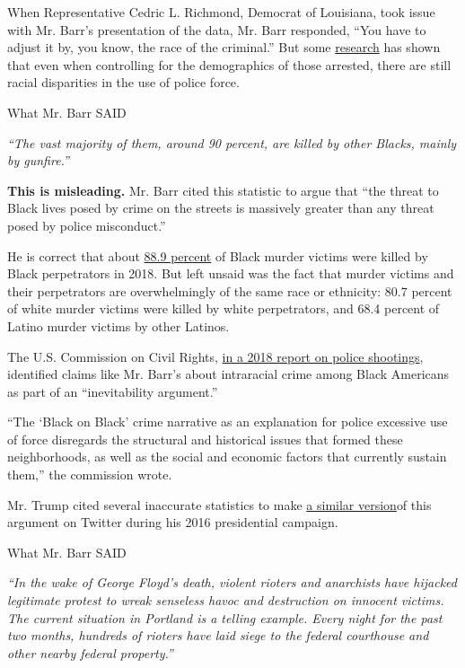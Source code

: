 When Representative Cedric L. Richmond, Democrat of Louisiana, took
issue with Mr. Barr's presentation of the data, Mr. Barr responded,
``You have to adjust it by, you know, the race of the criminal.'' But
some
\href{https://policingequity.org/images/pdfs-doc/CPE_SoJ_Race-Arrests-UoF_2016-07-08-1130.pdf}{research}
has shown that even when controlling for the demographics of those
arrested, there are still racial disparities in the use of police force.

What Mr. Barr SAID

\emph{``The vast majority of them, around 90 percent, are killed by
other Blacks, mainly by gunfire.''}

\textbf{This is misleading.} Mr. Barr cited this statistic to argue that
``the threat to Black lives posed by crime on the streets is massively
greater than any threat posed by police misconduct.''

He is correct that about
\href{https://ucr.fbi.gov/crime-in-the-u.s/2018/crime-in-the-u.s.-2018/tables/expanded-homicide-data-table-6.xls}{88.9
percent} of Black murder victims were killed by Black perpetrators in
2018. But left unsaid was the fact that murder victims and their
perpetrators are overwhelmingly of the same race or ethnicity: 80.7
percent of white murder victims were killed by white perpetrators, and
68.4 percent of Latino murder victims by other Latinos.

The U.S. Commission on Civil Rights,
\href{https://www.usccr.gov/pubs/2018/11-15-Police-Force.pdf}{in a 2018
report on police shootings}, identified claims like Mr. Barr's about
intraracial crime among Black Americans as part of an ``inevitability
argument.''

``The `Black on Black' crime narrative as an explanation for police
excessive use of force disregards the structural and historical issues
that formed these neighborhoods, as well as the social and economic
factors that currently sustain them,'' the commission wrote.

Mr. Trump cited several inaccurate statistics to make
\href{https://www.politifact.com/factchecks/2015/nov/23/donald-trump/trump-tweet-blacks-white-homicide-victims/}{a
similar version}of this argument on Twitter during his 2016 presidential
campaign.

What Mr. Barr SAID

\emph{``In the wake of George Floyd's death, violent rioters and
anarchists have hijacked legitimate protest to wreak senseless havoc and
destruction on innocent victims. The current situation in Portland is a
telling example. Every night for the past two months, hundreds of
rioters have laid siege to the federal courthouse and other nearby
federal property.''}

